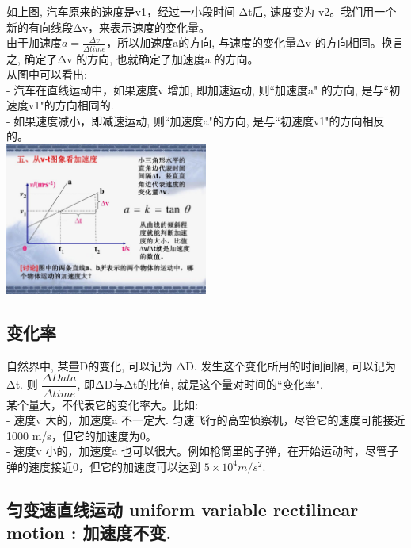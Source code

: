 \documentclass[UTF8]{ctexart}
\begin{document}
如上图, 汽车原来的速度是v1，经过一小段时间 Δt后, 速度变为 v2。我们用一个新的有向线段Δv，来表示速度的变化量。 \\
由于加速度$a=\frac{\varDelta v}{\varDelta time}$，所以加速度a的方向, 与速度的变化量Δv 的方向相同。换言之, 确定了Δv 的方向, 也就确定了加速度a 的方向。\\

从图中可以看出:  \\
- 汽车在直线运动中，如果速度v 增加, 即加速运动, 则``加速度a" 的方向, 是与``初速度v1"的方向相同的. \\
- 如果速度减小，即减速运动, 则``加速度a"的方向, 是与``初速度v1"的方向相反的。\\

\includegraphics[width=0.5\textwidth]{img/0108.jpg}

	
	\vspace{1em} 
	
\subsection{变化率}

自然界中, 某量D的变化, 可以记为 ΔD. 发生这个变化所用的时间间隔, 可以记为Δt. 则 $\dfrac{\varDelta Data}{\varDelta time}$, 即ΔD与Δt的比值, 就是这个量对时间的``变化率".\\

某个量大，不代表它的变化率大。比如: \\
- 速度v 大的，加速度a 不一定大. 匀速飞行的高空侦察机，尽管它的速度可能接近 1000 m/s，但它的加速度为0。\\
- 速度v 小的，加速度a 也可以很大。例如枪筒里的子弹，在开始运动时，尽管子弹的速度接近0，但它的加速度可以达到 $5×10^4 m/s^2$.\\

\vspace{1em} 


\subsection{匀变速直线运动 uniform variable rectilinear motion : 加速度不变.}	
\end{document}
